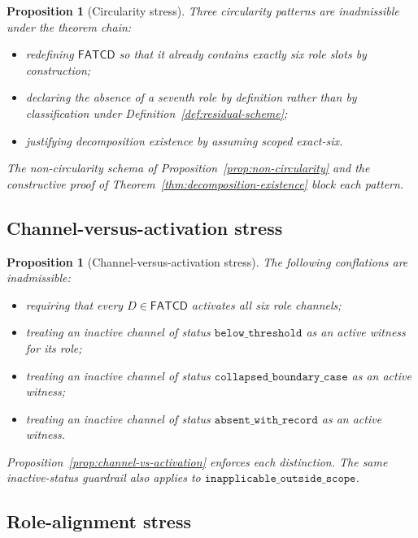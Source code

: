 \documentclass[11pt]{article}
\newtheorem{proposition}[theorem]{Proposition}
\theoremstyle{definition}
\newcommand{\FATCD}{\ensuremath{\mathsf{FATCD}}}
\newcommand{\belowthr}{\texttt{below\_threshold}}
\newcommand{\collapsedbc}{\texttt{collapsed\_boundary\_case}}
\newcommand{\absentrec}{\texttt{absent\_with\_record}}
\newcommand{\outsidescope}{\texttt{inapplicable\_outside\_scope}}
\begin{document}
\begin{proposition}[Circularity stress]\label{prop:circularity-stress}
Three circularity patterns are inadmissible under the theorem chain:
\begin{itemize}[topsep=2pt,itemsep=1pt]
  \item redefining \FATCD{} so that it already contains exactly six role
    slots by construction;
  \item declaring the absence of a seventh role by definition rather
    than by classification under Definition~\ref{def:residual-scheme};
  \item justifying decomposition existence by assuming scoped
    exact-six.
\end{itemize}
The non-circularity schema of Proposition~\ref{prop:non-circularity} and
the constructive proof of Theorem~\ref{thm:decomposition-existence}
block each pattern.
\end{proposition}

\subsection{Channel-versus-activation stress}\label{subsec:channel-activation-stress}

\begin{proposition}[Channel-versus-activation stress]\label{prop:channel-activation-stress}
The following conflations are inadmissible:
\begin{itemize}[topsep=2pt,itemsep=1pt]
  \item requiring that every \(D \in \FATCD{}\) activates all six role
    channels;
  \item treating an inactive channel of status \(\belowthr\) as an
    active witness for its role;
  \item treating an inactive channel of status \(\collapsedbc\) as an
    active witness;
  \item treating an inactive channel of status \(\absentrec\) as an
    active witness.
\end{itemize}
Proposition~\ref{prop:channel-vs-activation} enforces each distinction.
The same inactive-status guardrail also applies to
\(\outsidescope\).
\end{proposition}

\subsection{Role-alignment stress}\label{subsec:role-alignment-stress}
\end{document}
